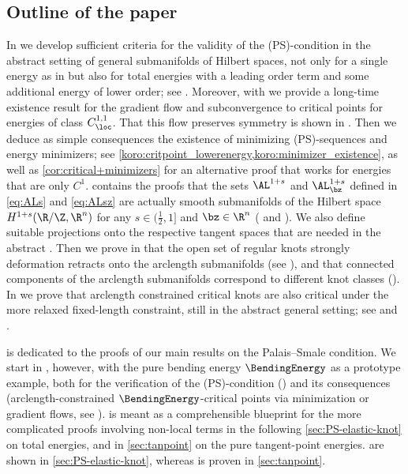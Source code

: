 \subsection{Outline of the paper}
In  we develop sufficient criteria for the  validity of the (PS)-condition
in the abstract setting of general submanifolds of Hilbert spaces, not only
for a single energy as in  but also for total energies with a leading order term and
some additional energy of lower order; see . Moreover, with
 we
provide a long-time existence result for the gradient flow and subconvergence
to critical points  for energies of class $C^{1,1}_\loc$. 
That this flow preserves symmetry is shown in 
. Then we
deduce as simple
consequences the existence of minimizing (PS)-sequences and energy minimizers;
see \cref{koro:critpoint_lowerenergy,koro:minimizer_existence}, as well as \cref{cor:critical+minimizers}
 for an alternative proof 
that works for energies that are only $C^1$.  contains the proofs
that the sets $\AL^{1+s}$ and $\AL^{1+s}_\bz$ defined in \cref{eq:ALs}
and \cref{eq:ALsz} are actually smooth submanifolds of the Hilbert space
$H^{1+s}(\R/\Z,\R^n)$ for any $s\in (\frac{1}{2},1]$ and
$\bz\in\R^n$ 
( and ).
We also define suitable projections onto the respective tangent spaces that are needed
in the abstract . Then we prove in  that the open set
of regular knots strongly deformation retracts onto the arclength submanifolds (see ), 
and that connected components
of the arclength submanifolds correspond to 
different knot classes (). 
In  we prove that
arclength constrained critical knots are also critical under the more
relaxed fixed-length constraint, still in the abstract general setting; see  and . 


 is dedicated to the proofs of
our main results on the Palais--Smale condition. We start in  , however,
 with the pure bending energy $\BendingEnergy$
as a prototype example, both for the verification of the (PS)-condition () and its consequences (arclength-constrained $\BendingEnergy$-critical 
points via minimization
or gradient flows, see ).  is meant as a
comprehensible blueprint for the more complicated proofs involving non-local terms
in the following \cref{sec:PS-elastic-knot} on total energies, and in
\cref{sec:tanpoint} on the pure tangent-point energies. 
 are shown in \cref{sec:PS-elastic-knot}, whereas  is proven in \cref{sec:tanpoint}.

